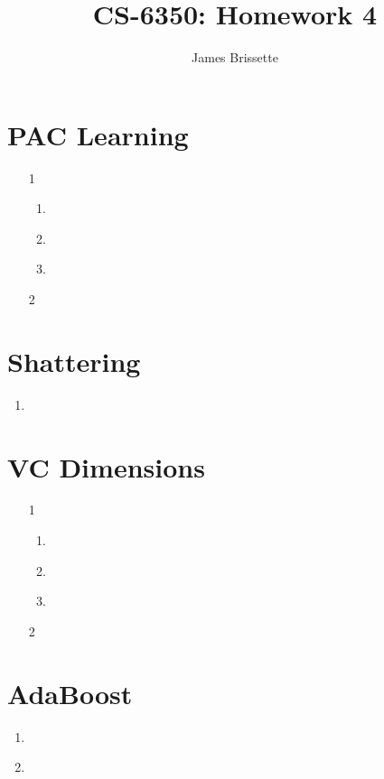 \documentclass[11pt,a4paper]{article}
\author{James Brissette}
\title{CS-6350: Homework 4}
\begin{document}
	\maketitle
	
	\section{PAC Learning}
		\begin{itemize}
			\item [1] ~
			\begin{enumerate}[label={\alph*)}]
				\item ~
				\item ~
				\item ~					
			\end{enumerate}
			
			\item [2]
		\end{itemize}
	
	\section{Shattering}
		\begin{enumerate}
			\item ~
		\end{enumerate}
	
	\section{VC Dimensions}
		\begin{itemize}
			\item [1] ~
			\begin{enumerate}[label={\alph*)}]
				\item ~
				\item ~
				\item ~					
			\end{enumerate}
			
			\item [2] ~
		\end{itemize}
	
	\section{AdaBoost}
		\begin{enumerate}
			\item ~
			\item ~
		\end{enumerate}
	
\end{document}
